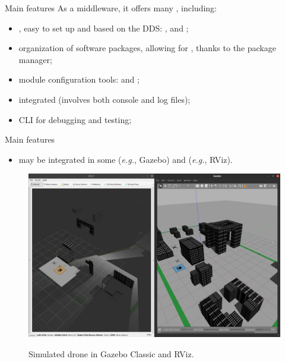 \begin{frame}{Main features}
	As a middleware, it offers many , including:
	\begin{itemize}
		\item {}, easy to set up and based on the DDS: ,  and ;
		\item organization of software packages, allowing for , thanks to the  package manager;
		\item module configuration tools:  and ;
		\item integrated  (involves both console and log files);
		\item CLI  for debugging and testing;
	\end{itemize}
\end{frame}
\begin{frame}{Main features}
  \begin{itemize}
    \item may be integrated in some  (\emph{e.g.}, Gazebo) and  (\emph{e.g.}, RViz).
  \end{itemize}
  \begin{figure}
    \centering
    \includegraphics[scale=.133]{simulation.png}
    \label{fig:sim}
    \caption{Simulated drone in Gazebo Classic and RViz.}
  \end{figure}
\end{frame}

